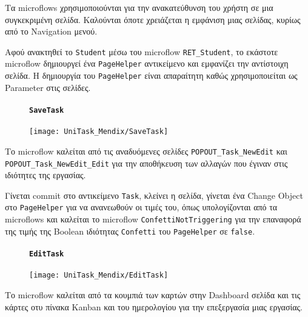                 Τα microflows χρησιμοποιούνται για την ανακατεύθυνση του χρήστη σε μια συγκεκριμένη σελίδα. Καλούνται όποτε χρειάζεται η εμφάνιση μιας σελίδας, κυρίως από το Navigation μενού.

                Αφού ανακτηθεί το \texttt{Student} μέσω του microflow \texttt{RET\_Student}, το εκάστοτε microflow δημιουργεί ένα \texttt{PageHelper} αντικείμενο και εμφανίζει την αντίστοιχη σελίδα. Η δημιουργία του \texttt{PageHelper} είναι απαραίτητη καθώς χρησιμοποιείται ως Parameter στις σελίδες.

                \begin{figure}[H] \noindent
                    \paragraph{\texttt{SaveTask}}
                    \begin{center}
                        \texttt{[image: UniTask\_Mendix/SaveTask]}
                    \end{center}
                \end{figure}

                Το microflow καλείται από τις αναδυόμενες σελίδες \texttt{POPOUT\_Task\_NewEdit} και \texttt{POPOUT\_Task\_NewEdit\_Edit} για την αποθήκευση των αλλαγών που έγιναν στις ιδιότητες της εργασίας.

                Γίνεται commit στο αντικείμενο \texttt{Task}, κλείνει η σελίδα, γίνεται ένα Change Object στο \texttt{PageHelper} για να ανανεωθούν οι τιμές του, όπως υπολογίζονται από τα microflows και καλείται το microflow \texttt{ConfettiNotTriggering} για την επαναφορά της τιμής της Boolean ιδιότητας \texttt{Confetti} του \texttt{PageHelper} σε \texttt{false}.

                \begin{figure}[H] \noindent
                    \paragraph{\texttt{EditTask}}
                    \begin{center}
                        \texttt{[image: UniTask\_Mendix/EditTask]}
                    \end{center}
                \end{figure}

                Το microflow καλείται από τα κουμπιά των καρτών στην Dashboard σελίδα και τις κάρτες οτυ πίνακα Kanban και του ημερολογίου για την επεξεργασία μιας εργασίας.

